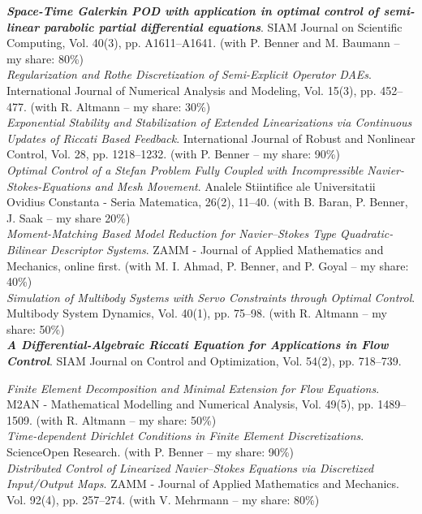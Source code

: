  \emph{\textbf{Space-Time Galerkin POD with application in optimal control of semi-linear parabolic partial differential equations}}. SIAM Journal on Scientific Computing, Vol. 40(3), pp. A1611--A1641. (with P. Benner and M. Baumann -- my share: 80\%) \\

 \emph{Regularization and Rothe Discretization of Semi-Explicit Operator DAEs}. International Journal of Numerical Analysis and Modeling, Vol. 15(3), pp. 452--477. (with R. Altmann -- my share: 30\%) \\

 \emph{Exponential Stability and Stabilization of Extended Linearizations via Continuous Updates of Riccati Based Feedback}. International Journal of Robust and Nonlinear Control, Vol. 28, pp. 1218--1232. (with P. Benner -- my share: 90\%) \\

 \emph{Optimal Control of a Stefan Problem Fully Coupled with Incompressible Navier-Stokes-Equations and Mesh Movement}. Analele Stiintifice ale Universitatii Ovidius Constanta - Seria Matematica, 26(2), 11--40. (with B. Baran, P. Benner, J. Saak -- my share 20\%) \\

 \emph{Moment-Matching Based Model Reduction for Navier--Stokes Type Quadratic-Bilinear Descriptor Systems}. ZAMM - Journal of Applied Mathematics and Mechanics, online first. (with M. I. Ahmad, P. Benner, and P. Goyal -- my share: 40\%) \\

 \emph{Simulation of Multibody Systems with Servo Constraints through Optimal Control}. Multibody System Dynamics, Vol. 40(1), pp. 75--98. (with R. Altmann -- my share: 50\%) \\

 {\textbf{\emph{A Differential-Algebraic Riccati Equation for Applications in Flow Control}}. SIAM Journal on Control and Optimization, Vol. 54(2), pp. 718--739.}\\

\newpage

 \emph{Finite Element Decomposition and Minimal Extension for Flow Equations}. M2AN - Mathematical Modelling and Numerical Analysis, Vol. 49(5), pp. 1489--1509. (with R. Altmann -- my share: 50\%) \\

 \emph{Time-dependent Dirichlet Conditions in Finite Element Discretizations}. ScienceOpen Research. (with P. Benner -- my share: 90\%)\\

 \emph{Distributed Control of Linearized Navier--Stokes Equations via Discretized Input/Output Maps}. ZAMM - Journal of Applied Mathematics and Mechanics. Vol. 92(4), pp. 257--274. (with V. Mehrmann -- my share: 80\%) 


